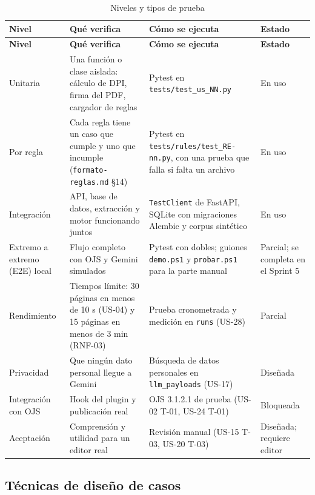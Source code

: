 {\small
\begin{longtable}{@{}>{\raggedright\arraybackslash}p{}>{\raggedright\arraybackslash}p{}>{\raggedright\arraybackslash}p{}>{\raggedright\arraybackslash}p{}@{}}
\caption{Niveles y tipos de prueba}\label{tab:3-8}\\
\toprule
\textbf{Nivel} & \textbf{Qué verifica} & \textbf{Cómo se ejecuta} & \textbf{Estado} \\
\midrule
\endfirsthead
\toprule
\textbf{Nivel} & \textbf{Qué verifica} & \textbf{Cómo se ejecuta} & \textbf{Estado} \\
\midrule
\endhead
\bottomrule
\endfoot
\endlastfoot
Unitaria & Una función o clase aislada: cálculo de DPI, firma del PDF, cargador de reglas & Pytest en \texttt{tests/\allowbreak{}test\_\allowbreak{}us\_\allowbreak{}NN.\allowbreak{}py} & En uso \\
Por regla & Cada regla tiene un caso que cumple y uno que incumple (\texttt{formato-\allowbreak{}reglas.\allowbreak{}md} §14) & Pytest en \texttt{tests/\allowbreak{}rules/\allowbreak{}test\_\allowbreak{}RE-nn.\allowbreak{}py}, con una prueba que falla si falta un archivo & En uso \\
Integración & API, base de datos, extracción y motor funcionando juntos & \texttt{TestClient} de FastAPI, SQLite con migraciones Alembic y corpus sintético & En uso \\
Extremo a extremo (E2E) local & Flujo completo con OJS y Gemini simulados & Pytest con dobles; guiones \texttt{demo.\allowbreak{}ps1} y \texttt{probar.\allowbreak{}ps1} para la parte manual & Parcial; se completa en el Sprint 5 \\
Rendimiento & Tiempos límite: 30 páginas en menos de 10 s (US-04) y 15 páginas en menos de 3 min (RNF-03) & Prueba cronometrada y medición en \texttt{runs} (US-28) & Parcial \\
Privacidad & Que ningún dato personal llegue a Gemini & Búsqueda de datos personales en \texttt{llm\_\allowbreak{}payloads} (US-17) & Diseñada \\
Integración con OJS & Hook del plugin y publicación real & OJS 3.1.2.1 de prueba (US-02 T-01, US-24 T-01) & Bloqueada \\
Aceptación & Comprensión y utilidad para un editor real & Revisión manual (US-15 T-03, US-20 T-03) & Diseñada; requiere editor \\
\end{longtable}
}

\subsection{Técnicas de diseño de casos}

